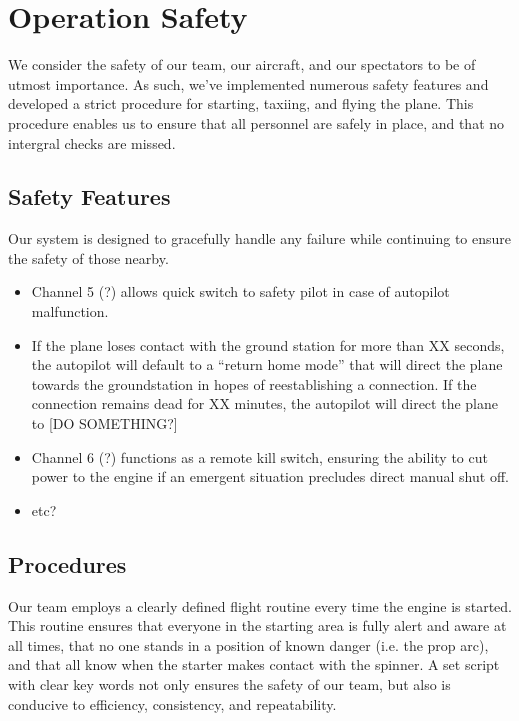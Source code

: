 \documentclass[10pt]{report}
\begin{document}
\section{Operation Safety}

We consider the safety of our team, our aircraft, and our spectators to be of utmost importance.  As such, we've implemented numerous safety features and developed a strict procedure for starting, taxiing, and flying the plane.  This procedure enables us to ensure that all personnel are safely in place, and that no intergral checks are missed.

\subsection{Safety Features}
Our system is designed to gracefully handle any failure while continuing to ensure the safety of those nearby. 
\begin{itemize}
	\setlength{\itemsep}{0cm}
	\setlength{\parskip}{0cm}
	\item Channel 5 (?) allows quick switch to safety pilot in case of autopilot malfunction.
	\item If the plane loses contact with the ground station for more than XX seconds, the autopilot will default to a ``return home mode'' that will direct the plane towards the groundstation in hopes of reestablishing a connection.  If the connection remains dead for XX minutes, the autopilot will direct the plane to [DO SOMETHING?]
	\item Channel 6 (?) functions as a remote kill switch, ensuring the ability to cut power to the engine if an emergent situation precludes direct manual shut off.
	\item etc?
\end{itemize}

\subsection{Procedures}
Our team employs a clearly defined flight routine every time the engine is started.  This routine ensures that everyone in the starting area is fully alert and aware at all times, that no one stands in a position of known danger (i.e. the prop arc), and that all know when the starter makes contact with the spinner.  A set script with clear key words not only ensures the safety of our team, but also is conducive to efficiency, consistency, and repeatability.

\newpage
\appendix
\renewcommand\thesection{Appendix \Alph{section}}
\end{document}
